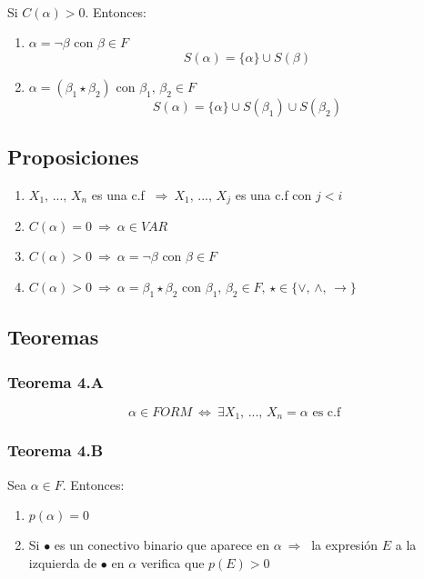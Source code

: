 \documentclass{article}
\newcommand{\comma}{,\,}                                %
\newcommand{\Rightarrows}{\: \Rightarrow \:}            %
\newcommand{\Leftrightarrows}{\: \Leftrightarrow \:}    %
\begin{document}
\leavevmode\\Si $C(\alpha) > 0$. Entonces:
\begin{enumerate}
	\item $\alpha = \neg \beta$ con $\beta \in F$
		\begin{equation*}
			S(\alpha) = \{\alpha\} \cup S(\beta)
		\end{equation*}
	\item $\alpha = (\beta_1 \star \beta_2)$ con $\beta_1 \comma \beta_2 \in F$
		\begin{equation*}
			S(\alpha) = \{\alpha\} \cup S(\beta_1) \cup S(\beta_2)
		\end{equation*}
\end{enumerate}


\subsection{Proposiciones}
\begin{enumerate}
	\item $X_1 \comma ... \comma X_n$ es una c.f $\Rightarrows X_1 \comma ... \comma X_j$ es una c.f
		con $j < i$
	\item $C(\alpha) = 0 \Rightarrows \alpha \in VAR$
	\item $C(\alpha) > 0 \Rightarrows \alpha = \neg \beta$ con $\beta \in F$
	\item $C(\alpha) > 0 \Rightarrows \alpha = \beta_1 \star \beta_2$ con $\beta_1 \comma \beta_2 \in F \comma \star \in \{ \vee \comma \wedge \comma \rightarrow \}$
\end{enumerate}

\subsection{Teoremas}
\subsubsection{Teorema 4.A}
\begin{equation*}
	\alpha \in FORM \Leftrightarrows \exists X_1 \comma ... \comma X_n = \alpha 
	\text{ es c.f }
\end{equation*}

\subsubsection{Teorema 4.B}
Sea $\alpha \in F$. Entonces:
\begin{enumerate}
	\item $p(\alpha) = 0$
	\item Si $\bullet$ es un conectivo binario que aparece en $\alpha 
		\Rightarrows$ la expresión $E$ a la izquierda de $\bullet$ en $\alpha$ verifica que
		$p(E) > 0$
\end{enumerate}
\end{document}
